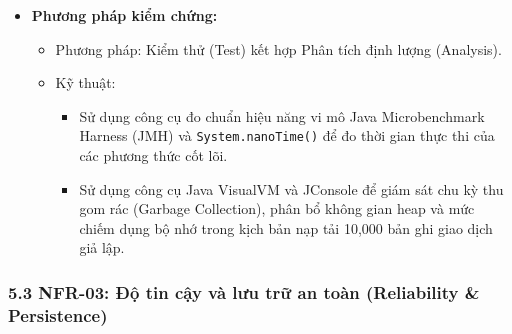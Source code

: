 \documentclass[11pt,a4paper]{article}
\providecommand{\tightlist}{
  \setlength{\itemsep}{0pt}\setlength{\parskip}{0pt}}
\begin{document}
\begin{itemize}
  \begin{itemize}
  \tightlist
  \item
    Thời gian phản hồi ghi sổ giao dịch mới (\(T_{write}\)): \(\le 100\)
    ms (đo tại bách phân vị 95th percentile).
  \item
    Thời gian phản hồi truy vấn và lọc lịch sử (\(T_{query}\) với số
    lượng giao dịch \(N \ge 2,000\)): \(\le 300\) ms.
  \item
    Thời gian tạo báo cáo dòng tiền trượt 12 tháng (\(T_{report}\) với
    \(N \ge 10,000\) giao dịch): \(\le 500\) ms.
  \item
    Thời gian khởi động nguội ứng dụng (\(T_{startup}\)): \(\le 2.0\)
    giây.
  \item
    Mức chiếm dụng bộ nhớ RAM tối đa (\(Memory_{RAM}\)): \(\le 256\) MB
    trong điều kiện làm việc liên tục.
  \end{itemize}
\item
  \textbf{Phương pháp kiểm chứng:}

  \begin{itemize}
  \tightlist
  \item
    Phương pháp: Kiểm thử (Test) kết hợp Phân tích định lượng
    (Analysis).
  \item
    Kỹ thuật:

    \begin{itemize}
    \tightlist
    \item
      Sử dụng công cụ đo chuẩn hiệu năng vi mô Java Microbenchmark
      Harness (JMH) và \texttt{System.nanoTime()} để đo thời gian thực
      thi của các phương thức cốt lõi.
    \item
      Sử dụng công cụ Java VisualVM và JConsole để giám sát chu kỳ thu
      gom rác (Garbage Collection), phân bổ không gian heap và mức chiếm
      dụng bộ nhớ trong kịch bản nạp tải 10,000 bản ghi giao dịch giả
      lập.
    \end{itemize}
  \end{itemize}
\end{itemize}

\subsubsection{5.3 NFR-03: Độ tin cậy và lưu trữ an toàn (Reliability \&
Persistence)}\label{53-nfr-03-ux111ux1ed9-tin-cux1eady-vuxe0-lux1b0u-trux1eef-an-touxe0n-reliability--persistence}
\end{document}
